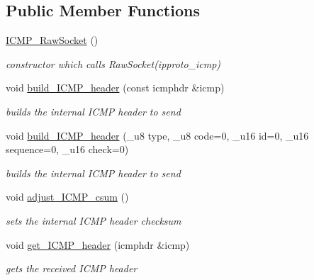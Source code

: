 \subsection*{Public Member Functions}
\begin{CompactItemize}
\item 
\hypertarget{classsocketpp_1_1ICMP__RawSocket_bed3b5ca33a0f7b4be42a9e6167266c0}{
\hyperlink{classsocketpp_1_1ICMP__RawSocket_bed3b5ca33a0f7b4be42a9e6167266c0}{ICMP\_\-RawSocket} ()}
\label{classsocketpp_1_1ICMP__RawSocket_bed3b5ca33a0f7b4be42a9e6167266c0}

\begin{CompactList}\small\item\em constructor which calls RawSocket(ipproto\_\-icmp) \item\end{CompactList}\item 
void \hyperlink{classsocketpp_1_1ICMP__RawSocket_7d8d54d4771f4012246835819421fbeb}{build\_\-ICMP\_\-header} (const icmphdr \&icmp)
\begin{CompactList}\small\item\em builds the internal ICMP header to send \item\end{CompactList}\item 
\hypertarget{classsocketpp_1_1ICMP__RawSocket_21c279a1c1a31d2395b2930de49b9c02}{
void \hyperlink{classsocketpp_1_1ICMP__RawSocket_21c279a1c1a31d2395b2930de49b9c02}{build\_\-ICMP\_\-header} (\_\-u8 type, \_\-u8 code=0, \_\-u16 id=0, \_\-u16 sequence=0, \_\-u16 check=0)}
\label{classsocketpp_1_1ICMP__RawSocket_21c279a1c1a31d2395b2930de49b9c02}

\begin{CompactList}\small\item\em builds the internal ICMP header to send \item\end{CompactList}\item 
\hypertarget{classsocketpp_1_1ICMP__RawSocket_ab00bba6ed9fe98ca771fc3310983c97}{
void \hyperlink{classsocketpp_1_1ICMP__RawSocket_ab00bba6ed9fe98ca771fc3310983c97}{adjust\_\-ICMP\_\-csum} ()}
\label{classsocketpp_1_1ICMP__RawSocket_ab00bba6ed9fe98ca771fc3310983c97}

\begin{CompactList}\small\item\em sets the internal ICMP header checksum \item\end{CompactList}\item 
void \hyperlink{classsocketpp_1_1ICMP__RawSocket_9b0ed9bb87d2895f2302db13b7ca5f06}{get\_\-ICMP\_\-header} (icmphdr \&icmp)
\begin{CompactList}\small\item\em gets the received ICMP header \item\end{CompactList}\end{CompactItemize}
